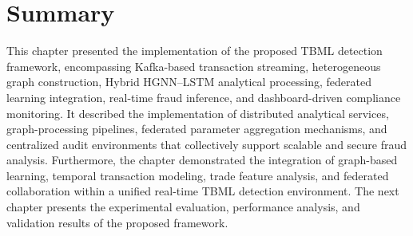 


\section{Summary}

This chapter presented the implementation of the proposed TBML detection framework, encompassing Kafka-based transaction streaming, heterogeneous graph construction, Hybrid HGNN--LSTM analytical processing, federated learning integration, real-time fraud inference, and dashboard-driven compliance monitoring. It described the implementation of distributed analytical services, graph-processing pipelines, federated parameter aggregation mechanisms, and centralized audit environments that collectively support scalable and secure fraud analysis. Furthermore, the chapter demonstrated the integration of graph-based learning, temporal transaction modeling, trade feature analysis, and federated collaboration within a unified real-time TBML detection environment. The next chapter presents the experimental evaluation, performance analysis, and validation results of the proposed framework.